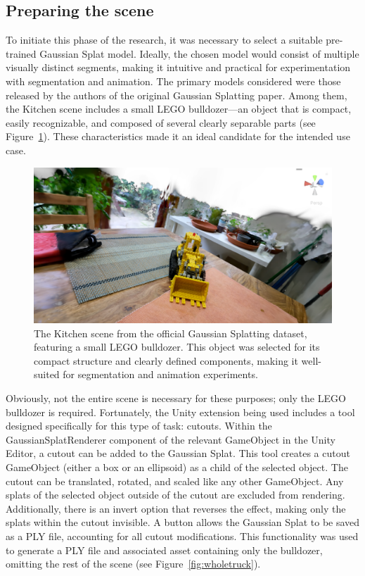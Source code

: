 \documentclass[12pt]{article}
\begin{document}
\subsection{Preparing the scene}
To initiate this phase of the research, it was necessary to select a suitable pre-trained Gaussian Splat model. Ideally, the chosen model would consist of multiple visually distinct segments, making it intuitive and practical for experimentation with segmentation and animation. The primary models considered were those released by the authors of the original Gaussian Splatting paper. Among them, the Kitchen scene includes a small LEGO bulldozer—an object that is compact, easily recognizable, and composed of several clearly separable parts (see Figure~\ref{fig:kitchen}). These characteristics made it an ideal candidate for the intended use case.
\begin{figure}[h!]
	\centering
	\includegraphics[width=\textwidth]{Images/Kitchen.png}
	\caption{The Kitchen scene from the official Gaussian Splatting dataset, featuring a small LEGO bulldozer. This object was selected for its compact structure and clearly defined components, making it well-suited for segmentation and animation experiments.}
	\label{fig:kitchen}
\end{figure}
\FloatBarrier
\noindent
Obviously, not the entire scene is necessary for these purposes; only the LEGO bulldozer is required. Fortunately, the Unity extension being used includes a tool designed specifically for this type of task: cutouts. Within the GaussianSplatRenderer component of the relevant GameObject in the Unity Editor, a cutout can be added to the Gaussian Splat. This tool creates a cutout GameObject (either a box or an ellipsoid) as a child of the selected object. The cutout can be translated, rotated, and scaled like any other GameObject. Any splats of the selected object outside of the cutout are excluded from rendering. Additionally, there is an invert option that reverses the effect, making only the splats within the cutout invisible. A button allows the Gaussian Splat to be saved as a PLY file, accounting for all cutout modifications. This functionality was used to generate a PLY file and associated asset containing only the bulldozer, omitting the rest of the scene (see Figure~\ref{fig:wholetruck}).
\end{document}
